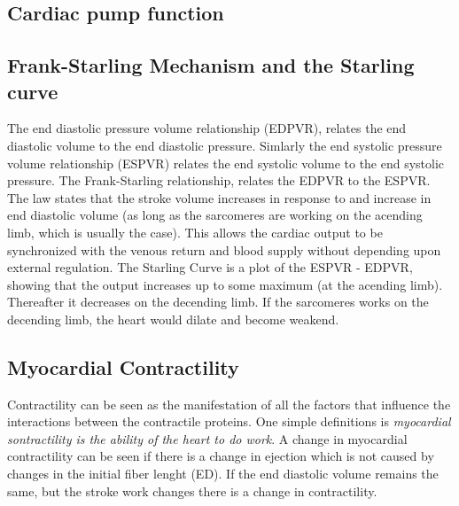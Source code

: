 \subsection{Cardiac pump function}



\subsection{Frank-Starling Mechanism and the Starling curve} 
The end diastolic pressure volume relationship (EDPVR), relates the end
diastolic volume to the end diastolic pressure. Simlarly the end
systolic pressure volume relationship (ESPVR) relates the end systolic
volume to the end systolic pressure. The Frank-Starling relationship,
relates the EDPVR to the ESPVR. The law states that the stroke volume
increases in response to and increase in end diastolic volume (as long
as the sarcomeres are working on the acending limb, which is usually
the case). This allows the cardiac output to be synchronized with the
venous return and blood supply without depending upon external
regulation.
The Starling Curve is a plot of the ESPVR - EDPVR, showing that the
output increases up to some maximum (at the acending limb). Thereafter
it decreases on the decending limb. If the sarcomeres works on the
decending limb, the heart would dilate and become weakend.

\subsection{Myocardial Contractility}

Contractility can be seen as the manifestation of all the factors that
influence the interactions between the contractile proteins.
One simple definitions is \emph{myocardial sontractility is the
  ability of the heart to do work}. A change in myocardial
contractility can be seen if there is a change in ejection which is
not caused by changes in the initial fiber lenght (ED). If the end
diastolic volume remains the same, but the stroke work changes there
is a change in contractility.



